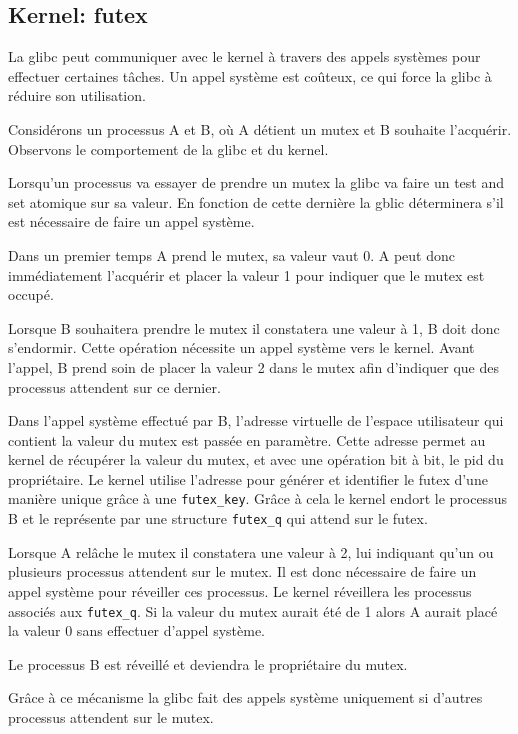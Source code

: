 \subsection{Kernel: futex}

La glibc peut communiquer avec le kernel à travers des appels systèmes pour effectuer certaines tâches.
Un appel système est coûteux, ce qui force la glibc à réduire son utilisation.

Considérons un processus A et B, où A détient un mutex et B souhaite l'acquérir. 
Observons le comportement de la glibc et du kernel.

Lorsqu'un processus va essayer de prendre un mutex la glibc va faire un test and set atomique sur sa valeur. 
En fonction de cette dernière la gblic déterminera s'il est nécessaire de faire un appel système. 

Dans un premier temps A prend le mutex, sa valeur vaut 0. A peut donc immédiatement l'acquérir et placer
la valeur 1 pour indiquer que le mutex est occupé.

Lorsque B souhaitera prendre le mutex il constatera une valeur à 1, B doit donc s'endormir. Cette opération
nécessite un appel système vers le kernel. Avant l'appel, B prend soin de placer la valeur 2 dans le mutex
afin d'indiquer que des processus attendent sur ce dernier.

Dans l'appel système effectué par B, l'adresse virtuelle de l'espace utilisateur qui contient
la valeur du mutex est passée en paramètre. Cette adresse permet au kernel de récupérer la valeur du mutex, et avec une opération bit à bit, le pid du propriétaire. 
Le kernel utilise l'adresse pour générer et identifier le futex d'une manière unique grâce à une \verb|futex_key|.
Grâce à cela le kernel endort le processus B et le représente par une structure \verb|futex_q| qui attend sur le futex.

Lorsque A relâche le mutex il constatera une valeur à 2, lui indiquant qu'un ou plusieurs processus
attendent sur le mutex. Il est donc nécessaire de faire un appel système pour réveiller ces processus.
Le kernel réveillera les processus associés aux \verb|futex_q|.
Si la valeur du mutex aurait été de 1 alors A aurait placé la valeur 0 sans effectuer d'appel système.

Le processus B est réveillé et deviendra le propriétaire du mutex.

Grâce à ce mécanisme la glibc fait des appels système uniquement si d'autres processus
attendent sur le mutex.

